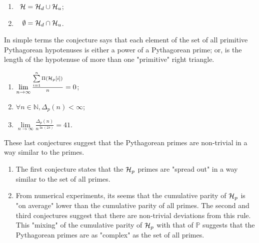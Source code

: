 \documentclass{article}
\theoremstyle{definition}
\begin{document}
\begin{enumerate}
  \item{$\hphantom{\emptyset}{\cal H} = {\cal H}_{d} \cup {\cal H}_u$;}
  \item{$\hphantom{\cal H}\emptyset = {\cal H}_{d} \cap {\cal H}_u$.}
\end{enumerate}

In simple terms the conjecture says that each element of the set of all primitive Pythagorean hypotenuses is either a power of a Pythagorean prime; or,
is the length of the hypotenuse of more than one "primitive" right triangle.

\begin{enumerate}
  \item{$\lim\limits_{n \rightarrow \infty} \frac{\sum\limits_{i=1}^n \Pi({\cal H}_p[i])}{n} = 0$;}
  \item{$\forall n\in \mathbb{N}, \Delta_p(n) < \infty$;}
  \item{$ \lim\limits_{n \rightarrow \infty} \frac{\Delta_p(n)}{n^{\ln(2 \pi)}} = 41$.}
\end{enumerate}

These last conjectures suggest that the Pythagorean primes are non-trivial in a way similar to the primes.
\begin{enumerate}
  \item{The first conjecture states that the ${\cal H}_p$ primes are "spread out" in a way similar to the set of all primes.}
  \item{From numerical experiments, its seems that the cumulative parity of ${\cal H}_p$ is "on average" lower than the cumulative parity of all primes.
      The second and third conjectures suggest that there 
      are non-trivial deviations from this rule. This "mixing" of the cumulative parity of ${\cal H}_p$ with that of $\mathbb{P}$ 
      suggests that the Pythagorean primes are as "complex" as the set of all primes.}
\end{enumerate}
\end{document}

